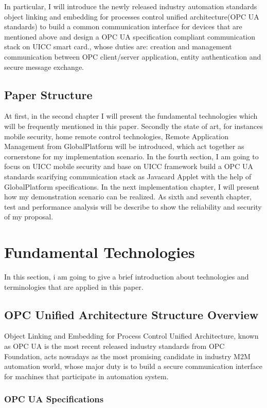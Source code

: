 \documentclass[]{llncs}
\begin{document}
In particular, I will introduce the newly released industry automation standards object linking and embedding for processes control unified architecture(OPC UA standards) to build a common communication interface for devices that are mentioned above and design a OPC UA specification compliant communication stack on UICC smart card., whose duties are: creation and management communication between OPC client/server application, entity authentication and secure message exchange.

\subsection{Paper Structure}
At first, in the second chapter I will present the fundamental technologies which will be frequently mentioned in this paper. Secondly the state of art, for instances mobile security,  home remote control technologies, Remote Application Management from GlobalPlatform will be introduced, which act together as cornerstone for my implementation scenario. In the fourth section, I am going to focus on  UICC mobile security  and base on UICC framework build a  OPC UA standards scarifying communication stack  as Javacard Applet with the help of GlobalPlatform  specifications. In the next implementation chapter, I will present how my  demonstration scenario can be realized. As sixth and seventh chapter,  test and performance analysis will be describe to show the reliability and security of my proposal.
  
\section{Fundamental Technologies}
In this section, i am going to give a brief introduction about technologies and terminologies that are applied in this paper. 

\subsection{OPC Unified Architecture Structure Overview }
Object Linking and Embedding for Process Control Unified Architecture, known as OPC UA is the most recent released industry standards from OPC Foundation, acts nowadays as the most promising candidate in industry M2M automation world, whose major duty is to build a secure communication interface for machines that participate in automation system. 

\subsubsection{OPC UA Specifications}
\end{document}
